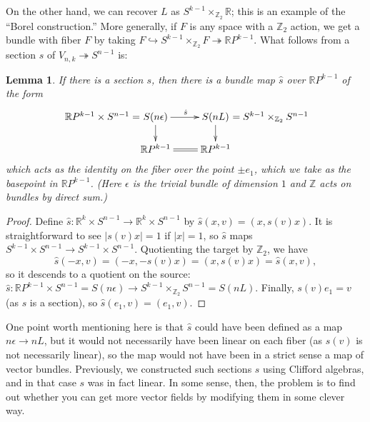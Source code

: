 \documentclass{article}
\newcommand{\Z}{\mathbb{Z}}
\newcommand{\R}{\mathbb{R}}
\newcommand{\RP}{\R P}
\newcommand{\into}{\hookrightarrow}
\newcommand{\onto}{\twoheadrightarrow}
\renewcommand{\to}{\longrightarrow}
\newtheorem{lem}[thm]{Lemma}
\theoremstyle{definition}
\begin{document}
On the other hand, we can recover $L$ as $S^{k-1} \times_{\Z_2} \R$; this is an example of the ``Borel construction.'' %
More generally, if $F$ is any space with a $\Z_2$ action, we get a bundle with fiber $F$ by taking $F \into S^{k-1} \times_{\Z_2} F \onto \RP^{k-1}$.  What follows from a section $s$ of $V_{n, k} \onto S^{n-1}$ is:
\begin{lem}
If there is a section $s$, then there is a bundle map $\hat s$ over $\RP^{k-1}$ of the form
\[\xymatrix@R=.6cm{
\makebox[0cm][r]{$\RP^{k-1} \times S^{n-1}=$\ }S(n \epsilon)\ar[r]^{\hat s}\ar[d]&
S(nL)\makebox[0cm][l]{\ $=S^{k-1} \times_{\Z_2} S^{n-1}$}\ar[d]\\
\RP^{k-1}\ar@{=}[r]&\RP^{k-1}
}\]
which acts as the identity on the fiber over the point $\pm e_1$, which we take as the basepoint in $\RP^{k-1}$.
(Here $\epsilon$ is the trivial bundle of dimension $1$ and $\Z$ acts on bundles by direct sum.)
\end{lem}
\begin{proof}
Define $\hat s: \R^k \times S^{n-1} \to \R^k \times S^{n-1}$ by $\hat s(x, v) = (x, s(v) x)$.  It is straightforward to see $|s(v) x| = 1$ if $|x| = 1$, so $\hat s$ maps $S^{k-1} \times S^{n-1} \to S^{k-1} \times S^{n-1}$.  Quotienting the target by $\Z_2$, we have \[\hat s(-x, v) = (-x, -s(v)x) = (x, s(v) x) = \hat{s}(x, v),\] so it descends to a quotient on the source: $\hat{s}: \RP^{k-1} \times S^{n-1} = S(n \epsilon) \to S^{k-1} \times_{\Z_2} S^{n-1} = S(nL)$.  Finally, $s(v)e_1 = v$ (as $s$ is a section), so $\hat{s}(e_1, v) = (e_1, v)$.
\end{proof}
One point worth mentioning here is that $\hat s$ could have been defined as a map $n \epsilon \to n L$, but it would not necessarily have been linear on each fiber (as $s(v)$ is not necessarily linear), so the map would not have been in a strict sense a map of vector bundles.  Previously, we constructed such sections $s$ using Clifford algebras, and in that case $s$ was in fact linear.  In some sense, then, the problem is to find out whether you can get more vector fields by modifying them in some clever way.
\end{document}
